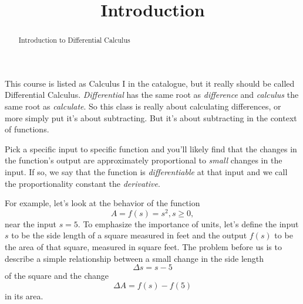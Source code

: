 \documentclass{ximera}
\title{Introduction}
\begin{document}
\begin{abstract}
Introduction to Differential Calculus
\end{abstract}
\maketitle


This course is listed as Calculus I in the catalogue, but it really should be called Differential Calculus. \emph{Differential} has the same root as \emph{difference} and \emph{calculus} the same root as \emph{calculate}. So this class is really about calculating differences, or more simply put it's about subtracting. But it's about subtracting in the context of functions. 


Pick a specific input to specific function and you'll likely find that the changes in the function's output are approximately proportional to \emph{small} changes in the input. If so, we say that the function is \emph{differentiable} at that input and we call the  proportionality constant the \emph{derivative}.

For example, let's look at the behavior of the function
\[
   A = f(s) = s^2 , s\geq 0,
\]
near the input $s=5$. To emphasize the importance of units, let's define the input $s$ to be the side length of a square measured in feet and the output $f(s)$ to be the area of that square, measured in square feet. The problem before us is to describe a simple relationship between a small change in the side length 
\[
     \Delta s = s -5
\]
of the square and the change 
\[
   \Delta A = f(s) - f(5)
\]
in its area. 
\end{document}
